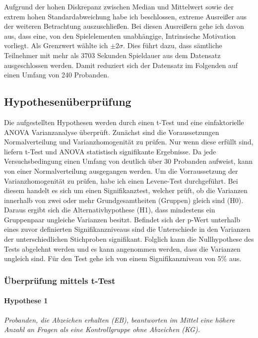 Aufgrund der hohen Diskrepanz zwischen Median und Mittelwert sowie der extrem hohen Standardabweichung habe ich beschlossen, extreme Ausreißer aus der weiteren Betrachtung auszuschließen. Bei diesen Ausreißern gehe ich davon aus, dass eine, von den Spielelementen unabhängige, Intrinsische Motivation vorliegt. Als Grenzwert wählte ich $\pm 2\sigma$. Dies führt dazu, dass sämtliche Teilnehmer mit mehr als 3703 Sekunden Spieldauer aus dem Datensatz ausgeschlossen werden. Damit reduziert sich der Datensatz im Folgenden auf einen Umfang von 240 Probanden.

\subsection{Hypothesenüberprüfung}
Die aufgestellten Hypothesen werden durch einen t-Test und eine einfaktorielle  ANOVA  Varianzanalyse überprüft. Zunächst sind die Voraussetzungen Normalverteilung und Varianzhomogenität zu prüfen. Nur wenn diese erfüllt sind, liefern t-Test und ANOVA statistisch signifikante Ergebnisse. Da jede Versuchsbedingung einen Umfang von deutlich über 30 Probanden aufweist, kann von einer Normalverteilung ausgegangen werden. Um die Vorraussetzung der Varianzhomogenität zu prüfen, habe ich einen Levene-Test durchgeführt. Bei diesem handelt es sich um einen Signifikanztest, welcher prüft, ob die Varianzen innerhalb von zwei oder mehr Grundgesamtheiten (Gruppen) gleich sind (H0). Daraus ergibt sich die Alternativhypothese (H1), dass mindestens ein Gruppenpaar ungleiche Varianzen besitzt. Befindet sich der p-Wert unterhalb  eines zuvor definierten Signifikanzniveaus sind die Unterschiede in den Varianzen der unterschiedlichen Stichproben signifikant. Folglich kann die Nullhypothese des Tests abgelehnt werden und es kann angenommen werden, dass die Varianzen ungleich sind. Für den Test gehe ich von einem Signifikanzniveau von 5\% aus. 

\subsubsection{Überprüfung mittels t-Test}

\paragraph{Hypothese 1 }
\begin{center}
    \textit{Probanden, die Abzeichen erhalten (EB), beantworten im Mittel eine höhere Anzahl an Fragen als eine Kontrollgruppe ohne Abzeichen (KG).} 
\end{center}


